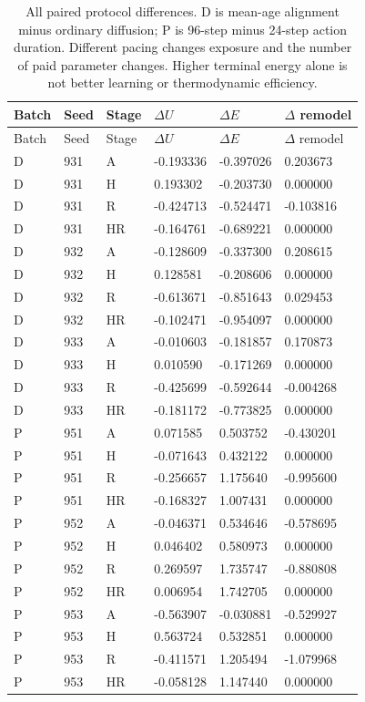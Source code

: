 \begingroup\scriptsize\setlength{\tabcolsep}{3pt}
\begin{longtable}{llllll}
\caption{All paired protocol differences. D is mean-age alignment minus ordinary diffusion; P is 96-step minus 24-step action duration. Different pacing changes exposure and the number of paid parameter changes. Higher terminal energy alone is not better learning or thermodynamic efficiency.}\label{tab:reach-pairs}\\
\toprule
Batch & Seed & Stage & $\Delta U$ & $\Delta E$ & $\Delta$ remodel\\
\midrule\endfirsthead
\toprule
Batch & Seed & Stage & $\Delta U$ & $\Delta E$ & $\Delta$ remodel\\
\midrule\endhead
D & 931 & A & -0.193336 & -0.397026 & 0.203673\\
D & 931 & H & 0.193302 & -0.203730 & 0.000000\\
D & 931 & R & -0.424713 & -0.524471 & -0.103816\\
D & 931 & HR & -0.164761 & -0.689221 & 0.000000\\
D & 932 & A & -0.128609 & -0.337300 & 0.208615\\
D & 932 & H & 0.128581 & -0.208606 & 0.000000\\
D & 932 & R & -0.613671 & -0.851643 & 0.029453\\
D & 932 & HR & -0.102471 & -0.954097 & 0.000000\\
D & 933 & A & -0.010603 & -0.181857 & 0.170873\\
D & 933 & H & 0.010590 & -0.171269 & 0.000000\\
D & 933 & R & -0.425699 & -0.592644 & -0.004268\\
D & 933 & HR & -0.181172 & -0.773825 & 0.000000\\
P & 951 & A & 0.071585 & 0.503752 & -0.430201\\
P & 951 & H & -0.071643 & 0.432122 & 0.000000\\
P & 951 & R & -0.256657 & 1.175640 & -0.995600\\
P & 951 & HR & -0.168327 & 1.007431 & 0.000000\\
P & 952 & A & -0.046371 & 0.534646 & -0.578695\\
P & 952 & H & 0.046402 & 0.580973 & 0.000000\\
P & 952 & R & 0.269597 & 1.735747 & -0.880808\\
P & 952 & HR & 0.006954 & 1.742705 & 0.000000\\
P & 953 & A & -0.563907 & -0.030881 & -0.529927\\
P & 953 & H & 0.563724 & 0.532851 & 0.000000\\
P & 953 & R & -0.411571 & 1.205494 & -1.079968\\
P & 953 & HR & -0.058128 & 1.147440 & 0.000000\\
\bottomrule
\end{longtable}
\endgroup

